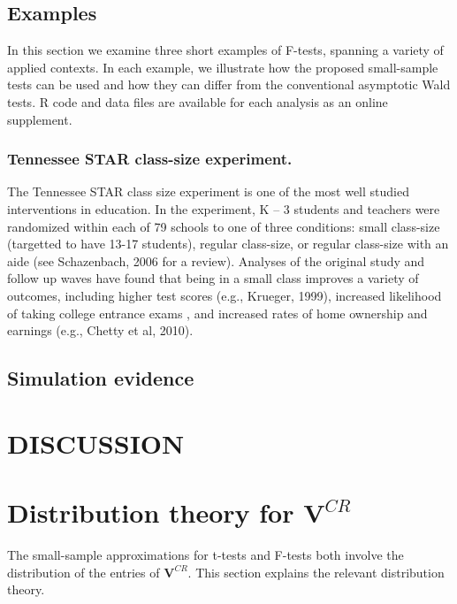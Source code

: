 \documentclass[12pt]{article}\usepackage[]{graphicx}\usepackage[]{color}
\newcommand{\bm}{\mathbf}
\begin{document}
\subsection{Examples}
\label{subsec:examples_F}

In this section we examine three short examples of F-tests, spanning a variety of applied contexts. In each example, we illustrate how the proposed small-sample tests can be used and how they can differ from the conventional asymptotic Wald tests. R code and data files are available for each analysis as an online supplement.

\subsubsection{Tennessee STAR class-size experiment.} 

The Tennessee STAR class size experiment is one of the most well studied interventions in education.  In the experiment, K – 3 students and teachers were randomized within each of 79 schools to one of three conditions: small class-size (targetted to have 13-17 students), regular class-size, or regular class-size with an aide (see Schazenbach, 2006 for a review). Analyses of the original study and follow up waves have found that being in a small class improves a variety of outcomes, including higher test scores (e.g., Krueger, 1999), increased likelihood of taking college entrance exams \citep{Krueger2001effect}, and increased rates of home ownership and earnings (e.g., Chetty et al, 2010). 

\subsection{Simulation evidence}
\label{subsec:simulation_t}

\section{DISCUSSION}
\label{sec:discussion}

\appendix
\section{Distribution theory for $\bm{V}^{CR}$}
\label{app:VCR_dist}

The small-sample approximations for t-tests and F-tests both involve the distribution of the entries of $\bm{V}^{CR}$. This section explains the relevant distribution theory.
\end{document}
